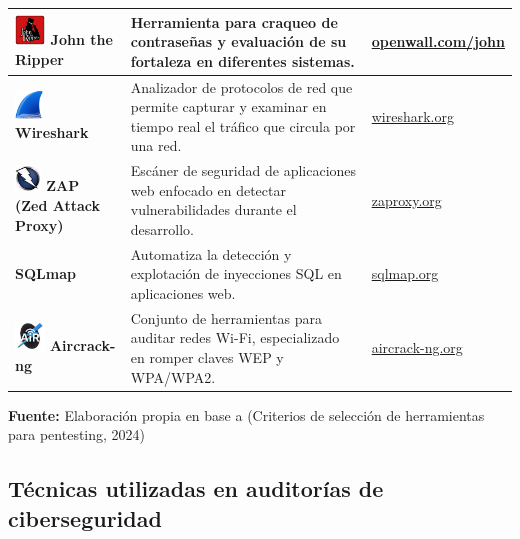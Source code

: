 \documentclass[a4paper, 10pt]{article}
\begin{document}
\begin{table}[H]
\begin{tabular}{|m{5cm}|m{8cm}|m{3.5cm}|}
        \hline
        \includegraphics[width=0.8cm]{images/john.png} \textbf{John the Ripper} & Herramienta para craqueo de contraseñas y evaluación de su fortaleza en diferentes sistemas. & \href{https://www.openwall.com/john}{openwall.com/john} \\
        \hline
        \includegraphics[width=0.75cm]{images/wireshark.png} \textbf{Wireshark} & Analizador de protocolos de red que permite capturar y examinar en tiempo real el tráfico que circula por una red. & \href{https://www.wireshark.org}{wireshark.org} \\
        \hline
        \includegraphics[width=0.7cm]{images/zap.jpeg} \textbf{ZAP (Zed Attack Proxy)} & Escáner de seguridad de aplicaciones web enfocado en detectar vulnerabilidades durante el desarrollo. & \href{https://www.zaproxy.org}{zaproxy.org} \\
        \hline
        \textbf{SQLmap} & Automatiza la detección y explotación de inyecciones SQL en aplicaciones web. & \href{https://sqlmap.org}{sqlmap.org} \\
        \hline
        \includegraphics[width=0.8cm]{images/aircrack.jpeg} \textbf{Aircrack-ng} & Conjunto de herramientas para auditar redes Wi-Fi, especializado en romper claves WEP y WPA/WPA2. & \href{https://www.aircrack-ng.org}{aircrack-ng.org} \\
        \hline
        \end{tabular}
    \begin{flushleft}\centering
        \footnotesize \textbf{Fuente:} Elaboración propia en base a (Criterios de selección de herramientas para pentesting, 2024)
    \end{flushleft}
    \end{table}



  
    
    \subsection{Técnicas utilizadas en auditorías de ciberseguridad}
\end{document}
